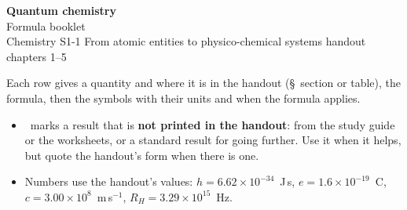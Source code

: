 \documentclass[10pt,a4paper]{article}
\begin{document}
\thispagestyle{first}

\begin{tcolorbox}[enhanced, colback=theme, colframe=theme, coltext=white, arc=2mm,
    boxrule=0pt, left=10pt, right=10pt, top=9pt, bottom=9pt]
  {\LARGE\bfseries Quantum chemistry}\\[3pt]
  {\Large Formula booklet}\\[6pt]
  {\small Chemistry S1-1 \textperiodcentered{} From atomic entities to physico-chemical
  systems \textperiodcentered{} handout chapters 1--5}
\end{tcolorbox}

\begin{keybox}[title={How to read this booklet}]
\small
Each row gives a quantity and where it is in the handout (\S\ section or table), the
formula, then the symbols with their units and when the formula applies.
\begin{itemize}
  \item \dagnote\ marks a result that is \textbf{not printed in the handout}: from the
    study guide or the worksheets, or a standard result for going further. Use it when
    it helps, but quote the handout's form when there is one.
  \item Numbers use the handout's values: $h = 6.62\times10^{-34}$~J\,s,
    $e = 1.6\times10^{-19}$~C, $c = 3.00\times10^8$~m\,s$^{-1}$,
    $R_H = 3.29\times10^{15}$~Hz.
\end{itemize}
\end{keybox}
\end{document}
